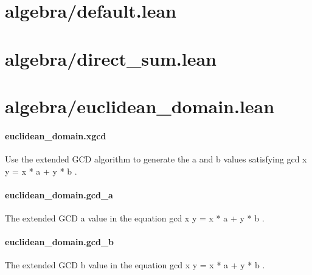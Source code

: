 \documentclass{article}
\begin{document}
\section{algebra/default.lean}\section{algebra/direct\_sum.lean}\section{algebra/euclidean\_domain.lean}\paragraph{euclidean\_domain.xgcd}
\par
Use the extended GCD algorithm to generate the 
\colorbox[RGB]{253,246,227}{{{{\color[RGB]{101, 123, 131} a }}}} and 
\colorbox[RGB]{253,246,227}{{{{\color[RGB]{101, 123, 131} b }}}} values
satisfying 
\colorbox[RGB]{253,246,227}{{{{\color[RGB]{101, 123, 131} gcd x y  }}}{{{\color[RGB]{181, 137, 0} = }}}{{{\color[RGB]{101, 123, 131}  x  }}}{{{\color[RGB]{181, 137, 0} * }}}{{{\color[RGB]{101, 123, 131}  a  }}}{{{\color[RGB]{181, 137, 0} + }}}{{{\color[RGB]{101, 123, 131}  y  }}}{{{\color[RGB]{181, 137, 0} * }}}{{{\color[RGB]{101, 123, 131}  b }}}}.
\paragraph{euclidean\_domain.gcd\_a}
\par
The extended GCD 
\colorbox[RGB]{253,246,227}{{{{\color[RGB]{101, 123, 131} a }}}} value in the equation 
\colorbox[RGB]{253,246,227}{{{{\color[RGB]{101, 123, 131} gcd x y  }}}{{{\color[RGB]{181, 137, 0} = }}}{{{\color[RGB]{101, 123, 131}  x  }}}{{{\color[RGB]{181, 137, 0} * }}}{{{\color[RGB]{101, 123, 131}  a  }}}{{{\color[RGB]{181, 137, 0} + }}}{{{\color[RGB]{101, 123, 131}  y  }}}{{{\color[RGB]{181, 137, 0} * }}}{{{\color[RGB]{101, 123, 131}  b }}}}.
\paragraph{euclidean\_domain.gcd\_b}
\par
The extended GCD 
\colorbox[RGB]{253,246,227}{{{{\color[RGB]{101, 123, 131} b }}}} value in the equation 
\colorbox[RGB]{253,246,227}{{{{\color[RGB]{101, 123, 131} gcd x y  }}}{{{\color[RGB]{181, 137, 0} = }}}{{{\color[RGB]{101, 123, 131}  x  }}}{{{\color[RGB]{181, 137, 0} * }}}{{{\color[RGB]{101, 123, 131}  a  }}}{{{\color[RGB]{181, 137, 0} + }}}{{{\color[RGB]{101, 123, 131}  y  }}}{{{\color[RGB]{181, 137, 0} * }}}{{{\color[RGB]{101, 123, 131}  b }}}}.
\end{document}
